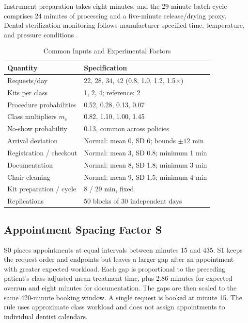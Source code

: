 \documentclass[conference]{IEEEtran}
\begin{document}
Instrument preparation takes eight minutes, and the 29-minute batch cycle comprises 24 minutes of processing and a five-minute release/drying proxy. Dental sterilization monitoring follows manufacturer-specified time, temperature, and pressure conditions \cite{cdc}.

\begin{table}[t]
\caption{Common Inputs and Experimental Factors}
\label{tab:inputs}
\centering\footnotesize
\begin{tabular}{@{}p{.40\linewidth}p{.55\linewidth}@{}}
\toprule
Quantity & Specification \\
\midrule
Requests/day & 22, 28, 34, 42 (0.8, 1.0, 1.2, 1.5$\times$) \\
Kits per class & 1, 2, 4; reference: 2 \\
Procedure probabilities & 0.52, 0.28, 0.13, 0.07 \\
Class multipliers $m_c$ & 0.82, 1.10, 1.00, 1.45 \\
No-show probability & 0.13, common across policies \\
Arrival deviation & Normal: mean 0, SD 6; bounds $\pm12$ min \\
Registration / checkout & Normal: mean 3, SD 0.8; minimum 1 min \\
Documentation & Normal: mean 8, SD 1.8; minimum 3 min \\
Chair cleaning & Normal: mean 9, SD 1.5; minimum 4 min \\
Kit preparation / cycle & 8 / 29 min, fixed \\
Replications & 50 blocks of 30 independent days \\
\bottomrule
\end{tabular}
\end{table}

\subsection{Appointment Spacing Factor S}
S0 places appointments at equal intervals between minutes 15 and 435. S1 keeps the request order and endpoints but leaves a larger gap after an appointment with greater expected workload. Each gap is proportional to the preceding patient's class-adjusted mean treatment time, plus 2.86 minutes for expected overrun and eight minutes for documentation. The gaps are then scaled to the same 420-minute booking window. A single request is booked at minute 15. The rule uses approximate class workload and does not assign appointments to individual dentist calendars.
\end{document}
